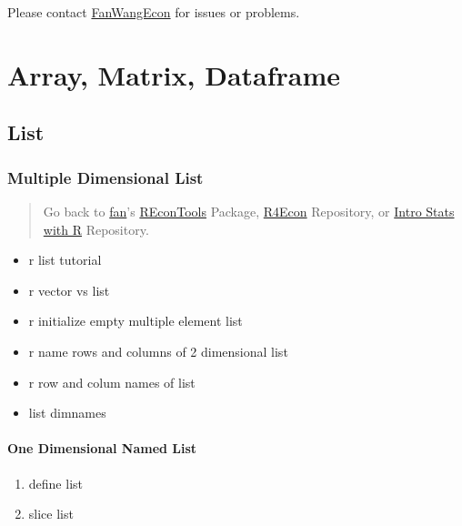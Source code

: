 \documentclass[
]{book}
\providecommand{\tightlist}{%
  \setlength{\itemsep}{0pt}\setlength{\parskip}{0pt}}
\begin{document}
Please contact \href{https://fanwangecon.github.io/}{FanWangEcon} for issues or problems.

\hypertarget{array-matrix-dataframe}{%
\chapter{Array, Matrix, Dataframe}\label{array-matrix-dataframe}}

\hypertarget{list}{%
\section{List}\label{list}}

\hypertarget{multiple-dimensional-list}{%
\subsection{Multiple Dimensional List}\label{multiple-dimensional-list}}

\begin{quote}
Go back to \href{http://fanwangecon.github.io/CodeDynaAsset/}{fan}'s \href{https://fanwangecon.github.io/REconTools/}{REconTools} Package, \href{https://fanwangecon.github.io/R4Econ/}{R4Econ} Repository, or \href{https://fanwangecon.github.io/Stat4Econ/}{Intro Stats with R} Repository.
\end{quote}

\begin{itemize}
\tightlist
\item
  r list tutorial
\item
  r vector vs list
\item
  r initialize empty multiple element list
\item
  r name rows and columns of 2 dimensional list
\item
  r row and colum names of list
\item
  list dimnames
\end{itemize}

\hypertarget{one-dimensional-named-list}{%
\subsubsection{One Dimensional Named List}\label{one-dimensional-named-list}}

\begin{enumerate}
\def\labelenumi{\arabic{enumi}.}
\tightlist
\item
  define list
\item
  slice list
\end{enumerate}
\end{document}

